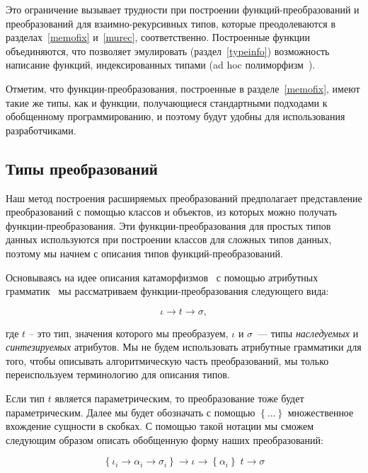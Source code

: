 Это ограничение вызывает трудности при построении функций-преобразований и преобразований для взаимно-рекурсивных типов, которые преодолеваются в разделах~\ref{memofix} и~\ref{murec}, соответственно. Построенные функции объединяются, что позволяет эмулировать (раздел~\ref{typeinfo}) возможность написание функций, индексированных типами (ad hoc полиморфизм~\cite{cardelli}).

Отметим, что функции-преобразования, построенные в разделе~\ref{memofix}, имеют такие же типы, как и функции, получающиеся стандартными подходами к обобщенному программированию, и  поэтому будут удобны для использования разработчиками. 

\subsection{Типы преобразований}
\label{transtypes}


Наш метод построения расширяемых преобразований предполагает представление преобразований с помощью классов и объектов, из которых можно получать функции-преобразования. Эти функции-преобразования для простых типов данных используются при построении классов для сложных типов данных, поэтому мы начнем с описания типов функций-преобразований.

Основываясь на идее описания катаморфизмов~\cite{Bananas} с помощью атрибутных 
грамматик~\cite{AGKnuth,ObjectAlgebrasAttribute,AGSwierstra} мы рассматриваем функции-преобразования следующего вида:

\[
\iota \to t \to \sigma,
\]

\noindent где $t$ -- это тип, значения которого мы преобразуем, $\iota$ и $\sigma$~--- типы \emph{наследуемых} и \emph{синтезируемых} атрибутов. 
Мы не будем использовать атрибутные грамматики для того, чтобы описывать алгоритмическую часть преобразований, мы только переиспользуем терминологию для описания типов. 

Если тип $t$ является параметрическим, то преобразование тоже будет параметрическим. Далее мы будет обозначать с помощью
$\left\{...\right\}$ множественное вхождение сущности в скобках. С помощью такой нотации мы сможем следующим образом описать обобщенную форму наших преобразований:

\[
  \left\{\iota_i \to \alpha_i \to \sigma_i\right\}\to\iota \to\left\{\alpha_i\right\}\;t \to \sigma
\]

